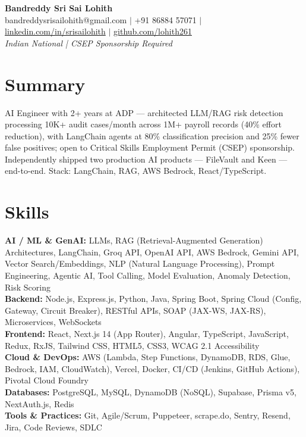 \documentclass[10pt,letterpaper]{article}
\newcommand{\skillrow}[2]{\textbf{#1:} #2 \\[1pt]}
\begin{document}
\begin{center}
  {\Huge\bfseries Bandreddy Sri Sai Lohith}\\[3pt]
  \small bandreddysrisailohith@gmail.com $\vert$\; +91 86884 57071 $\vert$\; \href{https://linkedin.com/in/srisailohith}{linkedin.com/in/srisailohith} $\vert$\; \href{https://github.com/lohith261}{github.com/lohith261} \\[2pt]
  \small\textit{Indian National | CSEP Sponsorship Required}
\end{center}

\section{Summary}

AI Engineer with 2+ years at ADP --- architected LLM/RAG risk detection processing 10K+ audit cases/month across 1M+ payroll records (40\% effort reduction), with LangChain agents at 80\% classification precision and 25\% fewer false positives; open to Critical Skills Employment Permit (CSEP) sponsorship.
      Independently shipped two production AI products --- FileVault and Keen --- end-to-end. Stack: LangChain, RAG, AWS Bedrock, React/TypeScript.

\section{Skills}

\skillrow{AI / ML \& GenAI}{LLMs, RAG (Retrieval-Augmented Generation) Architectures, LangChain, Groq API, OpenAI API, AWS Bedrock, Gemini API, Vector Search/Embeddings, NLP (Natural Language Processing), Prompt Engineering, Agentic AI, Tool Calling, Model Evaluation, Anomaly Detection, Risk Scoring}
\skillrow{Backend}{Node.js, Express.js, Python, Java, Spring Boot, Spring Cloud (Config, Gateway, Circuit Breaker), RESTful APIs, SOAP (JAX-WS, JAX-RS), Microservices, WebSockets}
\skillrow{Frontend}{React, Next.js 14 (App Router), Angular, TypeScript, JavaScript, Redux, RxJS, Tailwind CSS, HTML5, CSS3, WCAG 2.1 Accessibility}
\skillrow{Cloud \& DevOps}{AWS (Lambda, Step Functions, DynamoDB, RDS, Glue, Bedrock, IAM, CloudWatch), Vercel, Docker, CI/CD (Jenkins, GitHub Actions), Pivotal Cloud Foundry}
\skillrow{Databases}{PostgreSQL, MySQL, DynamoDB (NoSQL), Supabase, Prisma v5, NextAuth.js, Redis}
\skillrow{Tools \& Practices}{Git, Agile/Scrum, Puppeteer, scrape.do, Sentry, Resend, Jira, Code Reviews, SDLC}
\end{document}
